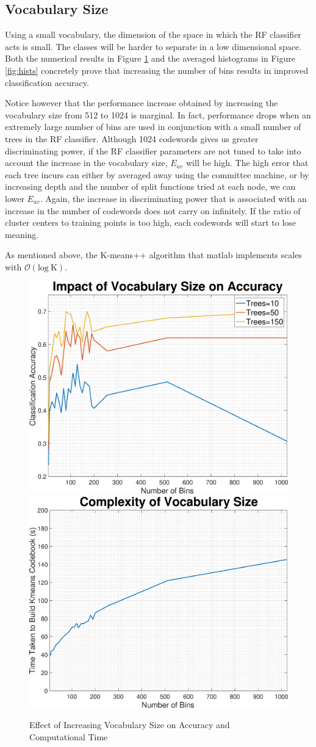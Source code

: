 \documentclass[a4paper,pra,twocolumn,10pt,aps,longbibliography,nobalancelastpage]{article}
\begin{document}
\subsection*{Vocabulary Size}

Using a small vocabulary, the dimension of the space in which the RF classifier acts is small. The classes will be harder to separate in a low dimensional space. Both the numerical results in Figure \ref{fig:bins_acc} and the averaged histograms in Figure \ref{fig:hists} concretely prove that increasing the number of bins results in improved classification accuracy.

Notice however that the performance increase obtained by increasing the vocabulary size from 512 to 1024 is marginal. In fact, performance drops when an extremely large number of bins are used in conjunction with a small number of trees in the RF classifier. Although 1024 codewords gives us greater discriminating power, if the RF classifier parameters are not tuned to take into account the increase in the vocabulary size, $E_{av}$ will be high. The high error that each tree incurs can either by averaged away using the committee machine, or by increasing depth and the number of split functions tried at each node, we can lower $E_{av}$. Again, the increase in discriminating power that is associated with an increase in the number of codewords does not carry on infinitely. If the ratio of cluster centers to training points is too high, each codewords will start to lose meaning. 

As mentioned above, the K-means++ algorithm that matlab implements scales with $\mathcal{O}(\text{log} \ \text{K})$.

\begin{figure}[H]
	\centering
    \includegraphics[width=0.49\columnwidth]{numBins_acc}
	\includegraphics[width=0.49\columnwidth]{numBins_complexity}
    \caption{Effect of Increasing Vocabulary Size on Accuracy and Computational Time}
    \label{fig:bins_acc}
\end{figure}
\end{document}
